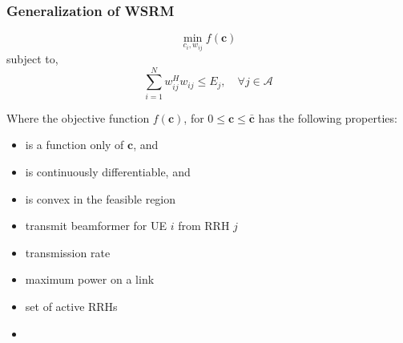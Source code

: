\documentclass[usenames,dvipsnames]{beamer}
\begin{document}
\begin{frame}
  \frametitle{Generalization of WSRM}
  \vspace*{-.5\baselineskip}
  \begin{exampleblock}{}
    \[
      \min_{c_{i},w_{ij}} f(\mathbf{c})
    \]
    subject to,
    \[
      \sum_{i=1}^{N}w_{ij}^{H}w_{ij}\leq E_{j},\quad \forall j\in \mathcal{A}
    \]
  \end{exampleblock}
  Where the objective function $f(\mathbf{c})$, for $0\leq\mathbf{c}\leq\bar{\mathbf{c}}$ has the following properties:
  \begin{itemize}
    \item { is a function only of $\mathbf{c}$, and}
    \item { is continuously differentiable, and}
    \item { is convex in the feasible region}
    \item { transmit beamformer for UE $i$ from RRH $j$}
    \item { transmission rate}
    \item { maximum power on a link}
    \item { set of active RRHs}
    \item {}
  \end{itemize}
\end{frame}
\end{document}
